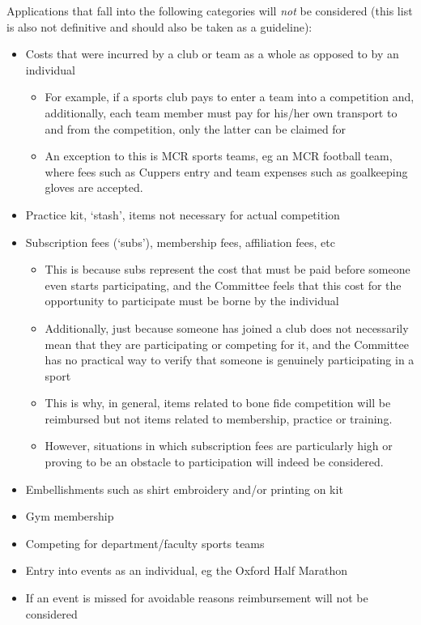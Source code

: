 Applications that fall into the following categories will \textit{not} be considered (this list is also not definitive and should also be taken as a guideline):
\begin{itemize}
	\item Costs that were incurred by a club or team as a whole as opposed to by an individual\begin{itemize}
		\item For example, if a sports club pays to enter a team into a competition and, additionally, each team member must pay for his/her own transport to and from the competition, only the latter can be claimed for
		\item An exception to this is MCR sports teams, eg an MCR football team, where fees such as Cuppers entry and team expenses such as goalkeeping gloves are accepted.
	\end{itemize}
	\item Practice kit, `stash', items not necessary for actual competition
	\item Subscription fees (`subs'), membership fees, affiliation fees, etc
	\begin{itemize}
		\item This is because subs represent the cost that must be paid before someone even starts participating, and the Committee feels that this cost for the opportunity to participate must be borne by the individual
		\item Additionally, just because someone has joined a club does not necessarily mean that they are participating or competing for it, and the Committee has no practical way to verify that someone is genuinely participating in a sport
		\item This is why, in general, items related to bone fide competition will be reimbursed but not items related to membership, practice or training.
		\item However, situations in which subscription fees are particularly high or proving to be an obstacle to participation will indeed be considered.
	\end{itemize}
	\item Embellishments such as shirt embroidery and/or printing on kit
	\item Gym membership
	\item Competing for department/faculty sports teams
	\item Entry into events as an individual, eg the Oxford Half Marathon
	\item If an event is missed for avoidable reasons reimbursement will not be considered
\end{itemize}

